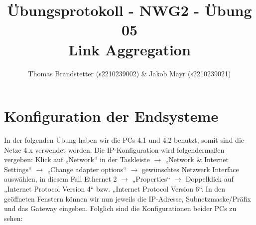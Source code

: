 \documentclass{article}
\title{Übungsprotokoll - NWG2 - Übung 05 \\ Link Aggregation}
\author{\vspace{0.5cm} Thomas Brandstetter (s2210239002) \& Jakob Mayr (s2210239021)}
\begin{document}
\maketitle

\section{Konfiguration der Endsysteme}

In der folgenden Übung haben wir die PCs 4.1 und 4.2 benutzt, somit sind die Netze 4.x verwendet worden. Die IP-Konfiguration wird folgendermaßen vergeben: Klick auf „Network“ in der Taskleiste $\rightarrow$ „Network \& Internet Settings“ $\rightarrow$ „Change adapter options“ $\rightarrow$ gewünschtes Netzwerk Interface auswählen, in diesem Fall Ethernet 2 $\rightarrow$ „Properties“ $\rightarrow$ Doppelklick auf „Internet Protocol Version 4“ bzw. „Internet Protocol Version 6“. In den geöffneten Fenstern können wir nun jeweils die IP-Adresse, Subnetzmaske/Präfix und das Gateway eingeben. Folglich sind die Konfigurationen beider PCs zu sehen:
\end{document}
